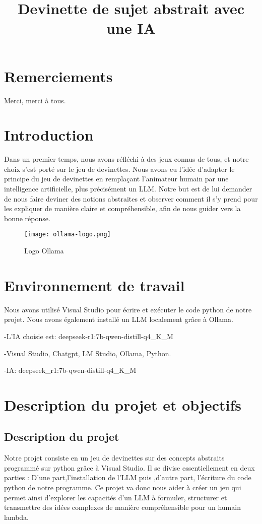 \documentclass[a4paper, 12pt, twoside]{article}
\title{Devinette de sujet abstrait avec une IA}
\begin{document}
\pagedegarde
\section*{Remerciements}
Merci, merci à tous.
\newpage

\tableofcontents
\newpage

\section{Introduction}
Dans un premier temps, nous avons réfléchi à des jeux connus de tous, et notre choix s’est porté sur le jeu de devinettes.
Nous avons eu l’idée d’adapter le principe du jeu de devinettes en remplaçant l’animateur humain par une intelligence artificielle, plus précisément un LLM.
Notre but est de lui demander de nous faire deviner des notions abstraites et observer comment il s’y prend pour les expliquer de manière claire et compréhensible, afin de nous guider vers la bonne réponse.





\begin{figure}[h]
\centering
\texttt{[image: ollama-logo.png]}
\caption{Logo Ollama}
\label{Tux}
\end{figure}



\section{Environnement de travail}
Nous avons utilisé Visual Studio pour écrire et exécuter le code python de notre projet.
Nous avons également installé un LLM localement  grâce à Ollama. 

-L’IA choisie est: deepseek-r1:7b-qwen-distill-q4_K_M

-Visual Studio, Chatgpt,  LM Studio, Ollama, Python. 

-IA: deepseek_r1:7b-qwen-distill-q4_K_M

\section{Description du projet et objectifs}
	\subsection{Description du projet}
 Notre projet consiste en un jeu de devinettes sur des concepts abstraits programmé sur python grâce à Visual Studio.  
 Il se divise essentiellement en deux parties : D’une part,l’installation de l’LLM puis ,d’autre part, l'écriture du code python de notre programme. Ce projet va donc nous aider à créer un jeu qui permet ainsi d’explorer les capacités d’un LLM à formuler, structurer et transmettre des idées complexes de manière compréhensible pour un humain lambda.
\end{document}

